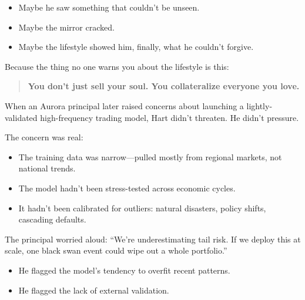 \begin{tcolorbox}[colback=gray!5!white, colframe=gray!50!black, breakable, title={Historical Sidebar: Bob Lee, the Lifestyle, and the Price of Admission}]
  \medskip
  
  \begin{itemize}
  \item Maybe he saw something that couldn’t be unseen.
  \item Maybe the mirror cracked.
  \item Maybe the lifestyle showed him, finally,  what he couldn’t forgive.
  \end{itemize}

  \medskip
  
  Because the thing no one warns you about the lifestyle is this: 

  \begin{quote}
    \textbf{You don’t just sell your soul.  You collateralize everyone you love.}
  \end{quote}
  
\end{tcolorbox}

\medskip

When an Aurora principal later raised concerns about launching a lightly-validated high-frequency trading model, Hart didn’t threaten. He didn’t pressure.

The concern was real:  
\begin{itemize}
  \item The training data was narrow—pulled mostly from regional markets, not national trends.  
  \item The model hadn’t been stress-tested across economic cycles.  
  \item It hadn’t been calibrated for outliers: natural disasters, policy shifts, cascading defaults.  
\end{itemize}

The principal worried aloud: “We’re underestimating tail risk. If we deploy this at scale, one black swan event could wipe out a whole portfolio.”  

\begin{itemize}
  \item He flagged the model’s tendency to overfit recent patterns.  
  \item He flagged the lack of external validation.
\end{itemize}

\medskip


